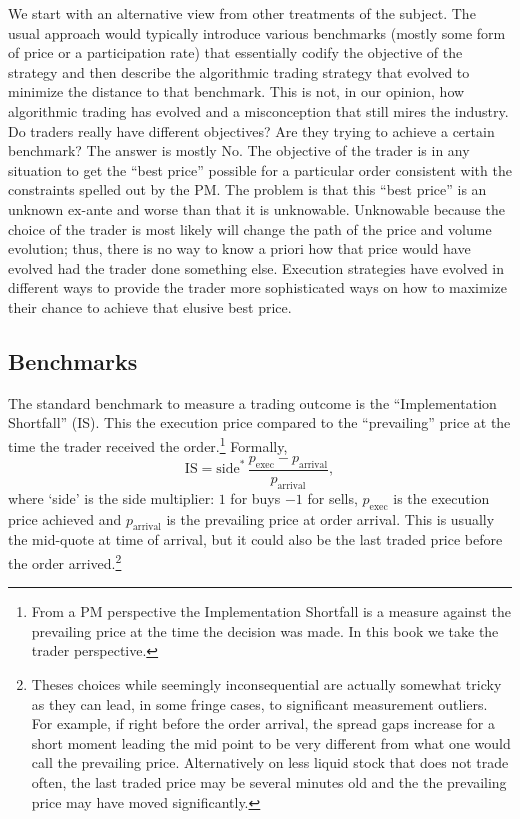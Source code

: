 We start with an alternative view from other treatments of the subject. The usual approach would typically introduce various benchmarks (mostly some form of price or a participation rate) that essentially codify the objective of the strategy and then describe the algorithmic trading strategy that evolved to minimize the distance to that benchmark. This is not, in our opinion, how algorithmic trading has evolved and a misconception that still mires the industry. Do traders really have different objectives? Are they trying to achieve a certain benchmark? The answer is mostly No. The objective of the trader is in any situation to get the ``best price'' possible for a particular order consistent with the constraints spelled out by the PM. The problem is that this ``best price''  is an unknown ex-ante and worse than that it is unknowable. Unknowable because the choice of the trader is most likely will change the path of the price and volume evolution; thus, there is no way to know a priori how that price would have evolved had the trader done something else. Execution strategies have evolved in different ways to provide the trader more sophisticated ways on how to maximize their chance to achieve that elusive best price.



\subsection{Benchmarks}

The standard benchmark to measure a trading outcome is the ``Implementation Shortfall'' (IS). This the execution price compared to the ``prevailing'' price at the time the trader received the order.\footnote{From a PM perspective the Implementation Shortfall is a measure against the prevailing price at the time the decision was made. In this book we take the trader perspective.} Formally,
        \begin{equation}
        \text{IS} = \text{side}^*\, \frac{p_{\text{exec}} - p_{\text{arrival}}}{p_{\text{arrival}}},
        \end{equation}
where `side' is the side multiplier: $1$ for buys $-1$ for sells, $p_{\text{exec}}$ is the execution price achieved and $p_{\text{arrival}}$ is the prevailing price at order arrival. This is usually the mid-quote at time of arrival, but it could also be the last traded price before the order arrived.\footnote{Theses choices while seemingly inconsequential are actually somewhat tricky as they can lead, in some fringe cases, to significant measurement outliers. For example, if right before the order arrival, the spread gaps increase for a short moment leading the mid point to be very different from what one would call the prevailing price. Alternatively on less liquid stock that does not trade often, the last traded price may be several minutes old and the the prevailing price may have moved significantly.}


